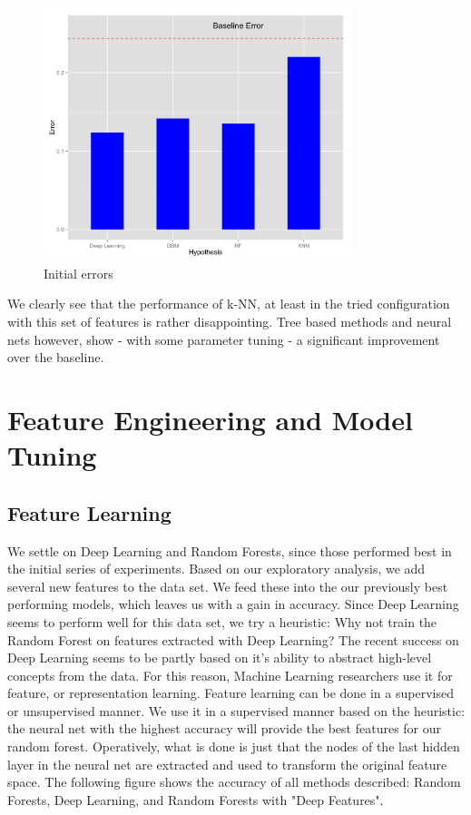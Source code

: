 \documentclass[paper=a4, fontsize=11pt]{scrartcl}
\numberwithin{equation}{section}
\numberwithin{figure}{section}
\numberwithin{table}{section}
\begin{document}
\begin{figure}[H]
    \centering
    \includegraphics[width=0.8\textwidth]{barchart_initial_errors.png}
    \caption{Initial errors}
    \label{fig:errors}
\end{figure}


We clearly see that the performance of k-NN, at least in the tried configuration with this set of features is rather disappointing. Tree based methods  and neural nets however, show - with some parameter tuning - a significant improvement over the baseline. 




\section{Feature Engineering and Model Tuning}

\subsection{Feature Learning}
We settle on Deep Learning and Random Forests, since those performed best in the initial series of experiments. Based on our exploratory analysis, we add several new features to the data set. We feed these into the our previously best performing models, which leaves us with a gain in accuracy. 
Since Deep Learning seems to perform well for this data set, we try a heuristic: Why not train the Random Forest on features extracted with Deep Learning? The recent success on Deep Learning seems to be partly based on it's ability to abstract high-level concepts from the data. For this reason, Machine Learning researchers use it for feature, or representation learning. Feature learning can be done in a supervised or unsupervised manner. We use it in a supervised manner based on the heuristic: the neural net with the highest accuracy will provide the best features for our random forest. Operatively, what is done is just that the nodes of the last hidden layer in the neural net are extracted and used to transform the original feature space. The following figure shows the accuracy of all methods described: Random Forests, Deep Learning, and Random Forests with "Deep Features". 
\end{document}
